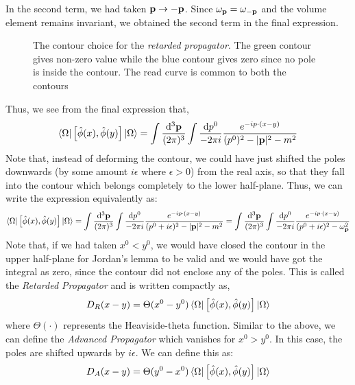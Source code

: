 In the second term, we had taken $\vb{p}\to -\vb{p}$. Since $\omega_{\vb{{p}}} = \omega_{-\vb{p}}$ and the volume element remains invariant, we obtained the second term in the final expression. 
\begin{figure}[H]
    \centering 


\caption{The contour choice for the \textit{retarded propagator}. The green contour gives non-zero value while the blue contour gives zero since no pole is inside the contour. The read curve is common to both the contours }
\end{figure}
\noindent
Thus, we see from the final expression that,
$$ \bra{\Omega} \left[ \hat{\phi}(x),  \hat{\phi}(y) \right]\ket{\Omega} = \int\frac{\dd^3\vb{{\vb{p}}}}{(2\pi)^3} \int\frac{\dd p^0}{-2\pi i} \frac{e^{-i p\cdot (x-y)}}{(p^0)^2 - |\vb{p}|^2-m^2}$$
Note that, instead of deforming the contour, we could have just shifted the poles downwards (by some amount $i\epsilon$ where $\epsilon>0$) from the real axis, so that they fall into the contour which belongs completely to the lower half-plane. Thus, we can write the expression equivalently as:
$$ \bra{\Omega} \left[ \hat{\phi}(x),  \hat{\phi}(y) \right]\ket{\Omega} = \int\frac{\dd^3\vb{{\vb{p}}}}{(2\pi)^3} \int\frac{\dd p^0}{-2\pi i} \frac{e^{-i p\cdot (x-y)}}{(p^0 + i\epsilon)^2 - |\vb{p}|^2-m^2} = \int\frac{\dd^3\vb{{\vb{p}}}}{(2\pi)^3} \int\frac{\dd p^0}{-2\pi i} \frac{e^{-i p\cdot (x-y)}}{(p^0 + i\epsilon)^2 - \omega_{\vb{{p}}}^2} $$
Note that, if we had taken $x^0<y^0$, we would have closed the contour in the upper half-plane for Jordan's lemma to be valid and we would have got the integral as zero, since the contour did not enclose any of the poles. This is called the \textit{Retarded Propagator} and is written compactly as,
$$D_R(x-y) = \Theta(x^0-y^0)\bra{\Omega} \left[ \hat{\phi}(x),  \hat{\phi}(y) \right]\ket{\Omega}$$
where $\Theta(\cdot)$ represents the Heaviside-theta function. Similar to the above, we can define the \textit{Advanced Propagator} which vanishes for $x^0>y^0$. In this case, the poles are shifted upwards by $i\epsilon$. We can define this as:
$$D_A(x-y) = \Theta(y^0-x^0)\bra{\Omega} \left[ \hat{\phi}(x),  \hat{\phi}(y) \right]\ket{\Omega}$$


